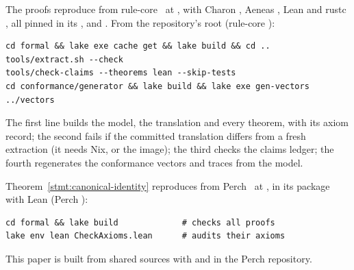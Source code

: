 The proofs reproduce from rule-core~\cite{rule-core} at
, with Charon , Aeneas
, Lean  and rustc
, all pinned in its ,
 and . From the
repository's root (rule-core ):
\begin{Verbatim}[fontsize=\footnotesize,xleftmargin=1em]
cd formal && lake exe cache get && lake build && cd ..
tools/extract.sh --check
tools/check-claims --theorems lean --skip-tests
cd conformance/generator && lake build && lake exe gen-vectors ../vectors
\end{Verbatim}
The first line builds the model, the translation and every theorem, with its
axiom record; the second fails if the committed translation differs from a fresh
extraction (it needs Nix, or the  image); the third checks the
claims ledger; the fourth regenerates the conformance vectors and traces from the
model.

Theorem~\ref{stmt:canonical-identity} reproduces from Perch~\cite{perch-src} at
, in its  package with Lean
 (Perch ):
\begin{Verbatim}[fontsize=\footnotesize,xleftmargin=1em]
cd formal && lake build             # checks all proofs
lake env lean CheckAxioms.lean      # audits their axioms
\end{Verbatim}
This paper is built from shared sources with
  and
 in the Perch repository.
